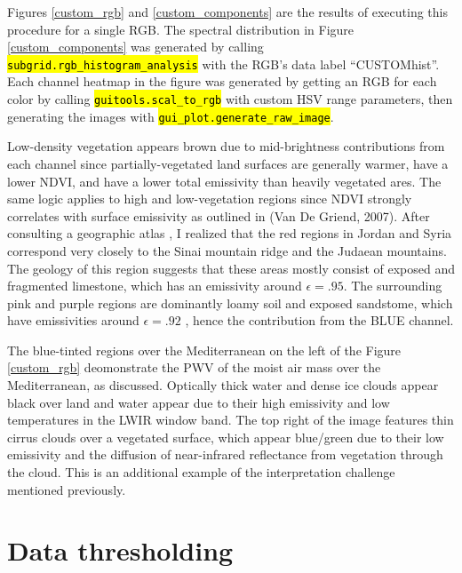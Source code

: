 \documentclass[12pt]{article}
\newcommand{\hltexttt}[1]{\texttt{\hl{#1}}}
\begin{document}
Figures \ref{custom_rgb} and \ref{custom_components} are the results of executing this procedure for a single RGB. The spectral distribution in Figure \ref{custom_components} was generated by calling \hltexttt{subgrid.rgb\_histogram\_analysis} with the RGB's data label ``CUSTOMhist''. Each channel heatmap in the figure was generated by getting an RGB for each color by calling \hltexttt{guitools.scal\_to\_rgb} with custom HSV range parameters, then generating the images with \hltexttt{gui\_plot.generate\_raw\_image}.

 Low-density vegetation appears brown due to mid-brightness contributions from each channel since partially-vegetated land surfaces are generally warmer, have a lower NDVI, and have a lower total emissivity than heavily vegetated ares. The same logic applies to high and low-vegetation regions since NDVI strongly correlates with surface emissivity as outlined in (Van De Griend, 2007)\cite{griend2007}. After consulting a geographic atlas \cite{compactworldatlas}, I realized that the red regions in Jordan and Syria correspond very closely to the Sinai mountain ridge and the Judaean mountains. The geology of this region suggests that these areas mostly consist of exposed and fragmented limestone, which has an emissivity around $\epsilon=.95$. The surrounding pink and purple regions are dominantly loamy soil and exposed sandstome, which have emissivities around $\epsilon=.92$ \cite{compactworldatlas}\cite{mineo2021}\cite{bentor1980}, hence the contribution from the BLUE channel.

The blue-tinted regions over the Mediterranean on the left of the Figure \ref{custom_rgb} deomonstrate the PWV of the moist air mass over the Mediterranean, as discussed. Optically thick water and dense ice clouds appear black over land and water appear due to their high emissivity and low temperatures in the LWIR window band. The top right of the image features thin cirrus clouds over a vegetated surface, which appear blue/green due to their low emissivity and the diffusion of near-infrared reflectance from vegetation through the cloud. This is an additional example of the interpretation challenge mentioned previously.

\clearpage

\section{Data thresholding}
\end{document}
